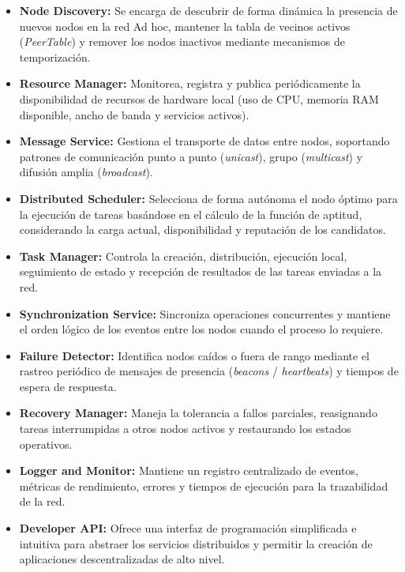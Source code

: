 \documentclass{article}
\begin{document}
\begin{itemize}
    \item \textbf{Node Discovery:} Se encarga de descubrir de forma dinámica la presencia de nuevos nodos en la red Ad hoc, mantener la tabla de vecinos activos (\textit{PeerTable}) y remover los nodos inactivos mediante mecanismos de temporización.

    \item \textbf{Resource Manager:} Monitorea, registra y publica periódicamente la disponibilidad de recursos de hardware local (uso de CPU, memoria RAM disponible, ancho de banda y servicios activos).

    \item \textbf{Message Service:} Gestiona el transporte de datos entre nodos, soportando patrones de comunicación punto a punto (\textit{unicast}), grupo (\textit{multicast}) y difusión amplia (\textit{broadcast}).

    \item \textbf{Distributed Scheduler:} Selecciona de forma autónoma el nodo óptimo para la ejecución de tareas basándose en el cálculo de la función de aptitud, considerando la carga actual, disponibilidad y reputación de los candidatos.

    \item \textbf{Task Manager:} Controla la creación, distribución, ejecución local, seguimiento de estado y recepción de resultados de las tareas enviadas a la red.

    \item \textbf{Synchronization Service:} Sincroniza operaciones concurrentes y mantiene el orden lógico de los eventos entre los nodos cuando el proceso lo requiere.

    \item \textbf{Failure Detector:} Identifica nodos caídos o fuera de rango mediante el rastreo periódico de mensajes de presencia (\textit{beacons} / \textit{heartbeats}) y tiempos de espera de respuesta.

    \item \textbf{Recovery Manager:} Maneja la tolerancia a fallos parciales, reasignando tareas interrumpidas a otros nodos activos y restaurando los estados operativos.

    \item \textbf{Logger and Monitor:} Mantiene un registro centralizado de eventos, métricas de rendimiento, errores y tiempos de ejecución para la trazabilidad de la red.

    \item \textbf{Developer API:} Ofrece una interfaz de programación simplificada e intuitiva para abstraer los servicios distribuidos y permitir la creación de aplicaciones descentralizadas de alto nivel.
\end{itemize}
\end{document}

